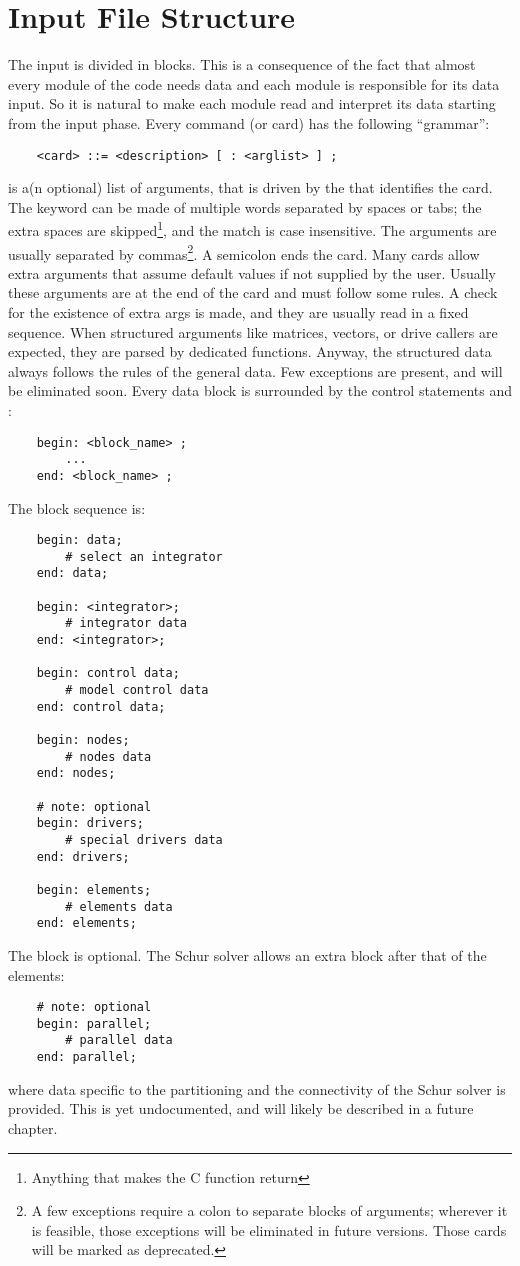 \section{Input File Structure}
The input is divided in blocks.
This is a consequence of the fact that almost every module of the code 
needs data and each module is responsible for its data input. 
So it is natural to make each module read and interpret its data starting 
from the input phase.
Every command (or card) has the following ``grammar'':
\begin{verbatim}
    <card> ::= <description> [ : <arglist> ] ;
\end{verbatim}
 is a(n optional) list of arguments, that is driven by the 
 that identifies the card. 
The keyword can be made of multiple words separated by spaces or tabs; 
the extra spaces are skipped\footnote{
	Anything that makes the C function  
	return 
}, and the match is case insensitive. 
The arguments are usually separated by commas\footnote{
	A few exceptions require a colon to separate blocks of arguments;
	wherever it is feasible, those exceptions will be eliminated 
	in future versions.
	Those cards will be marked as deprecated.
}.
A semicolon ends the card. 
Many cards allow extra arguments that assume default values 
if not supplied by the user. 
Usually these arguments are at the end of the card
and must follow some rules. 
A check for the existence of extra args is made,
and they are usually read in a fixed sequence.
When structured arguments like matrices, vectors, or drive callers are
expected, they are parsed by dedicated functions.
Anyway, the structured data always follows the rules of the general data. 
Few exceptions are present, and will be eliminated soon.
Every data block is surrounded by the control statements  and
:
\begin{verbatim}
    begin: <block_name> ;
        ...
    end: <block_name> ;
\end{verbatim}
The block sequence is:
\begin{verbatim}
    begin: data;
        # select an integrator
    end: data;

    begin: <integrator>;
        # integrator data
    end: <integrator>;

    begin: control data;
        # model control data
    end: control data;

    begin: nodes;
        # nodes data
    end: nodes;

    # note: optional
    begin: drivers;
        # special drivers data
    end: drivers;

    begin: elements;
        # elements data
    end: elements;
\end{verbatim}
The  block is optional.
The Schur solver allows an extra block after that of the elements:
\begin{verbatim}
    # note: optional
    begin: parallel;
        # parallel data
    end: parallel;
\end{verbatim}
where data specific to the partitioning and the connectivity
of the Schur solver is provided.
This is yet undocumented, and will likely be described 
in a future chapter.

